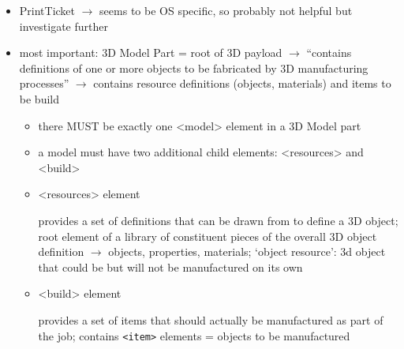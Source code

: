 \begin{itemize}
    

    \item PrintTicket $\rightarrow$ seems to be OS specific, so probably not helpful but \todo investigate further
    \item most important: 3D Model Part = root of 3D payload $\rightarrow$ ``contains definitions of one or more objects to be fabricated by 3D manufacturing processes''\cite[p.~6]{3mf_consortium_3mf_2025} $\rightarrow$ contains resource definitions (objects, materials) and items to be build 

    \begin{itemize}
        \item there MUST be exactly one <model> element in a 3D Model part
        \item a model must have two additional child elements: <resources> and <build>
        \item <resources> element
        
        provides a set of definitions that can be drawn from to define a 3D object; root element of a library of constituent pieces of the overall 3D object definition $\rightarrow$ objects, properties, materials; `object resource': 3d object that could be but will not be manufactured on its own
        
        \item <build> element
        
        provides a set of items that should actually be manufactured as part of the job; contains \texttt{<item>} elements = objects to be manufactured
    \end{itemize}
\end{itemize}
